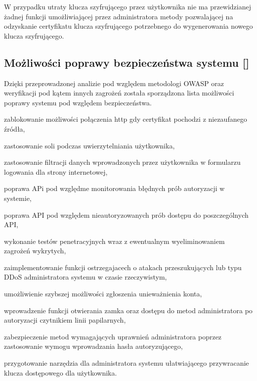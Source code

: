  W przypadku utraty klucza szyfrującego przez użytkownika nie ma przewidzianej żadnej funkcji umożliwiającej przez administratora metody pozwalającej na odzyskanie certyfikatu klucza szyfrującego potrzebnego do wygenerowania nowego klucza szyfrującego.
 
\subsection{Możliwości poprawy bezpieczeństwa systemu [\StudentA]}

Dzięki przeprowadzonej analizie pod względem metodologi OWASP oraz weryfikacji pod kątem innych zagrożeń została sporządzona lista możliwości poprawy systemu pod względem bezpieczeństwa. 
\begin{itemize*}
	\item zablokowanie możliwości połączenia http gdy certyfikat pochodzi z niezaufanego źródła,
	\item zastosowanie soli podczas uwierzytelniania użytkownika,
	\item  zastosowanie filtracji danych wprowadzonych przez użytkownika w formularzu logowania dla strony internetowej,
	\item poprawa APi pod względme monitorowania błędnych prób autoryzacji w systemie,
	\item  poprawa API pod względem nieautoryzowanych prób dostępu do poszczególnych API,
	\item wykonanie testów penetracyjnych wraz z ewentualnym wyeliminowaniem zagrożeń wykrytych,
	\item zaimplementowanie funkcji ostrzegajacech o atakach przeszukujących lub typu DDoS administratora systemu w czasie rzeczywistym,
	\item umożliwienie szybszej możliwości zgłoszenia unieważnienia konta, 
	\item wprowadzenie funkcji otwierania zamka oraz dostępu do metod administratora po autoryzacji czytnikiem linii papilarnych,
	\item zabezpieczenie metod wymagających uprawnień administratora poprzez zastosowanie wymogu wprowadzania hasła autoryzującego,
	\item przygotowanie narzędzia dla administratora systemu ułatwiającego przywracanie klucza dostępowego dla użytkownika. 
\end{itemize*}

 
